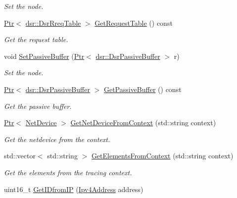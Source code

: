 \begin{DoxyCompactItemize}
\begin{DoxyCompactList}\small\item\em Set the node. \end{DoxyCompactList}\item 
\hyperlink{classns3_1_1Ptr}{Ptr}$<$ \hyperlink{classns3_1_1dsr_1_1DsrRreqTable}{dsr\+::\+Dsr\+Rreq\+Table} $>$ \hyperlink{classns3_1_1dsr_1_1DsrRouting_a86141cf3706e21637e9d97d341bd1ca9}{Get\+Request\+Table} () const 
\begin{DoxyCompactList}\small\item\em Get the request table. \end{DoxyCompactList}\item 
void \hyperlink{classns3_1_1dsr_1_1DsrRouting_a10d09f5b58b469d0a7c92926f61dd9ab}{Set\+Passive\+Buffer} (\hyperlink{classns3_1_1Ptr}{Ptr}$<$ \hyperlink{classns3_1_1dsr_1_1DsrPassiveBuffer}{dsr\+::\+Dsr\+Passive\+Buffer} $>$ r)
\begin{DoxyCompactList}\small\item\em Set the node. \end{DoxyCompactList}\item 
\hyperlink{classns3_1_1Ptr}{Ptr}$<$ \hyperlink{classns3_1_1dsr_1_1DsrPassiveBuffer}{dsr\+::\+Dsr\+Passive\+Buffer} $>$ \hyperlink{classns3_1_1dsr_1_1DsrRouting_ae53372c864f32f34bc1964865a3865fe}{Get\+Passive\+Buffer} () const 
\begin{DoxyCompactList}\small\item\em Get the passive buffer. \end{DoxyCompactList}\item 
\hyperlink{classns3_1_1Ptr}{Ptr}$<$ \hyperlink{classns3_1_1NetDevice}{Net\+Device} $>$ \hyperlink{classns3_1_1dsr_1_1DsrRouting_a5160f9f3016a0ee25fd5d52be1e4d51e}{Get\+Net\+Device\+From\+Context} (std\+::string context)
\begin{DoxyCompactList}\small\item\em Get the netdevice from the context. \end{DoxyCompactList}\item 
std\+::vector$<$ std\+::string $>$ \hyperlink{classns3_1_1dsr_1_1DsrRouting_a147011231253d86c4b2d6a5a8fb0a152}{Get\+Elements\+From\+Context} (std\+::string context)
\begin{DoxyCompactList}\small\item\em Get the elements from the tracing context. \end{DoxyCompactList}\item 
uint16\+\_\+t \hyperlink{classns3_1_1dsr_1_1DsrRouting_a4593e50d5f36e9b9b013fe0422067c44}{Get\+I\+Dfrom\+IP} (\hyperlink{classns3_1_1Ipv4Address}{Ipv4\+Address} address)

\end{DoxyCompactItemize}

